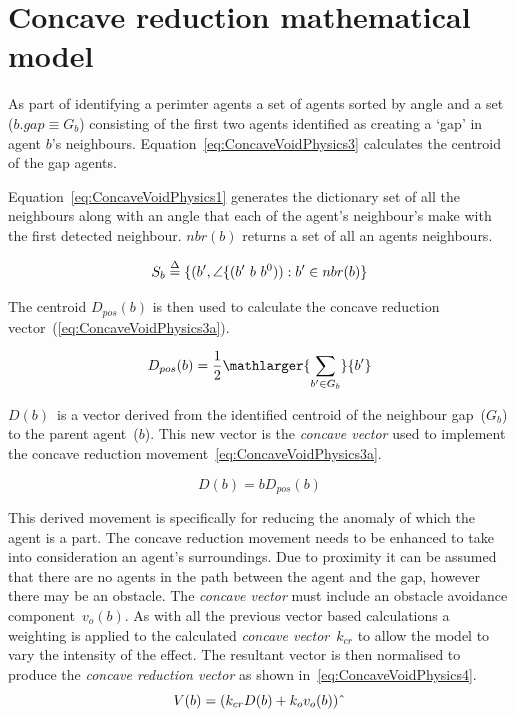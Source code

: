 \documentclass{ieeeaccess}
\begin{document}
\section{Concave reduction mathematical model}\label{concave:ConcaveVoidReduction1}
As part of identifying a perimter agents a set of agents sorted by angle and a set ($b.gap \equiv G_b$) consisting of the first two agents identified as creating a `gap' in agent $b$'s neighbours. Equation~\eqref{eq:ConcaveVoidPhysics3} calculates the centroid of the gap agents. 

Equation~\eqref{eq:ConcaveVoidPhysics1} generates the dictionary set of all the neighbours along with an angle that each of the agent’s neighbour’s make with the first detected neighbour. $nbr(b)$ returns a set of all an agents neighbours.

\begin{equation}
\label{eq:ConcaveVoidPhysics1}
S_b \buildrel \Delta \over = \{(b',\angle\{(b'~b~b^0)) : b' \in nbr(b)\}
\end{equation}

The centroid $D_{pos}(b)$ is then used to calculate the concave reduction vector~(\ref{eq:ConcaveVoidPhysics3a}).

\begin{equation}
\label{eq:ConcaveVoidPhysics3}
D_{pos}(b) = \frac{1}{2}\mathlarger{\sum_{b' \in G_b}}{b'} 
\end{equation}

$D(b)$~is a vector derived from the identified centroid of the neighbour gap~($G_b$) to the parent agent~($b$). This new vector is the \textit{concave vector} used to implement the concave reduction movement~\eqref{eq:ConcaveVoidPhysics3a}.

\begin{equation}
\label{eq:ConcaveVoidPhysics3a}
D(b) = bD_{pos}(b) 
\end{equation}

This derived movement is specifically for reducing the anomaly of which the agent is a part. The concave reduction movement needs to be enhanced to take into consideration an agent's surroundings. Due to proximity it can be assumed that there are no agents in the path between the agent and the gap, however there may be an obstacle. The \textit{concave vector} must include an obstacle avoidance component~$v_o(b)$. As with all the previous vector based calculations a weighting is applied to the calculated \textit{concave vector}~$k_{cr}$ to allow the model to vary the intensity of the effect. The resultant vector is then normalised to produce the \textit{concave reduction vector} as shown in~\eqref{eq:ConcaveVoidPhysics4}. 
%
\begin{equation}
\label{eq:ConcaveVoidPhysics4}
V(b) = (k_{cr}D(b) + k_ov_o(b))\string^
\end{equation}
%
\end{document}
